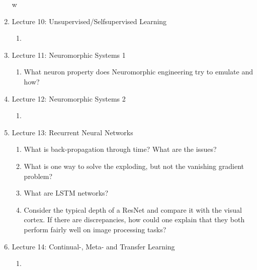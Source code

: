 \documentclass[main]{subfiles}
\begin{document}
\begin{enumerate}
w
    
    \item{Lecture 10: Unsupervised/Selfsupervised Learning}
    \begin{enumerate}[label*=\arabic*.]
        \item
    \end{enumerate}
    
    \item{Lecture 11: Neuromorphic Systems 1}
    \begin{enumerate}[label*=\arabic*.]
        \item What neuron property does Neuromorphic engineering try to emulate and how? 
    \end{enumerate}
    
    \item{Lecture 12: Neuromorphic Systems 2}
    \begin{enumerate}[label*=\arabic*.]
        \item 
    \end{enumerate}

    \item{Lecture 13: Recurrent Neural Networks}
    \begin{enumerate}[label*=\arabic*.]
        \item What is back-propagation through time? What are the issues?
        \item What is one way to solve the exploding, but not the vanishing gradient problem?
        \item What are LSTM networks?
        \item Consider the typical depth of a ResNet and compare it with the visual cortex. If there are discrepancies, how could one explain that they both perform fairly well on image processing tasks? 
    \end{enumerate}
    
    \item{Lecture 14: Continual-, Meta- and Transfer Learning}
    \begin{enumerate}[label*=\arabic*.]
        \item 
    \end{enumerate}
    
\end{enumerate}
\end{document}
